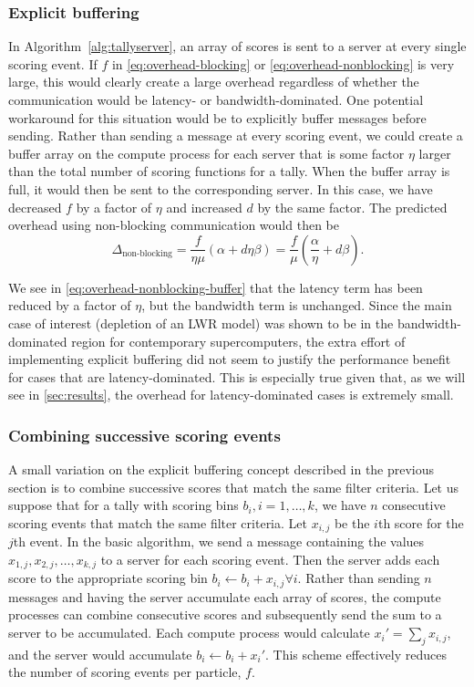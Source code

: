 \documentclass[3p]{elsarticle}
\begin{document}
\subsubsection{Explicit buffering}

In Algorithm~\ref{alg:tallyserver}, an array of scores is sent to a server at
every single scoring event. If $f$ in \eqref{eq:overhead-blocking} or
\eqref{eq:overhead-nonblocking} is very large, this would clearly create a large
overhead regardless of whether the communication would be latency- or
bandwidth-dominated. One potential workaround for this situation would be to
explicitly buffer messages before sending. Rather than sending a message at
every scoring event, we could create a buffer array on the compute process for
each server that is some factor $\eta$ larger than the total number of scoring
functions for a tally. When the buffer array is full, it would then be sent to
the corresponding server. In this case, we have decreased $f$ by a factor of
$\eta$ and increased $d$ by the same factor. The predicted overhead using
non-blocking communication would then be
\begin{equation}
  \label{eq:overhead-nonblocking-buffer}
  \Delta_{\text{non-blocking}} = \frac{f}{\eta\mu} \left ( \alpha + d\eta\beta
  \right ) = \frac{f}{\mu} \left ( \frac{\alpha}{\eta} + d\beta \right ).
\end{equation}

\noindent We see in \eqref{eq:overhead-nonblocking-buffer} that the latency term
has been reduced by a factor of $\eta$, but the bandwidth term is
unchanged. Since the main case of interest (depletion of an LWR model) was shown
to be in the bandwidth-dominated region for contemporary supercomputers, the
extra effort of implementing explicit buffering did not seem to justify the
performance benefit for cases that are latency-dominated. This is especially
true given that, as we will see in \autoref{sec:results}, the overhead for
latency-dominated cases is extremely small.

\subsubsection{Combining successive scoring events}

A small variation on the explicit buffering concept described in the previous
section is to combine successive scores that match the same filter criteria. Let
us suppose that for a tally with scoring bins $b_i, i = 1, \dots, k$, we have
$n$ consecutive scoring events that match the same filter criteria. Let
$x_{i,j}$ be the $i$th score for the $j$th event. In the basic algorithm, we
send a message containing the values $x_{1,j}, x_{2,j}, \dots, x_{k,j}$ to a
server for each scoring event. Then the server adds each score to the
appropriate scoring bin $b_i \gets b_i + x_{i,j} \forall i$. Rather than sending
$n$ messages and having the server accumulate each array of scores, the compute
processes can combine consecutive scores and subsequently send the sum to a
server to be accumulated. Each compute process would calculate $x_i' = \sum_j
x_{i,j}$, and the server would accumulate $b_i \gets b_i + x_i'$. This scheme
effectively reduces the number of scoring events per particle, $f$.
\end{document}
